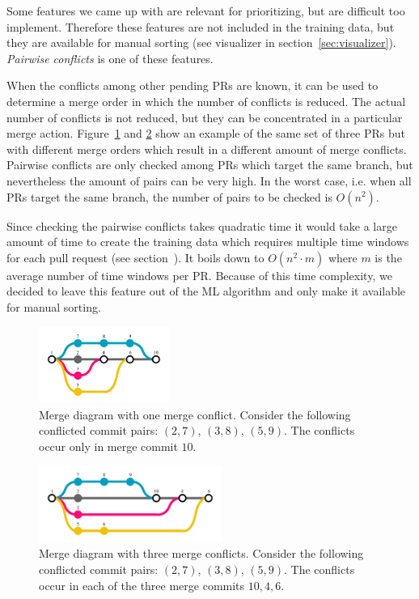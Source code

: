 Some features we came up with are relevant for prioritizing, but are difficult too implement.
Therefore these features are not included in the training data, but they are available for manual sorting (see visualizer in section~\ref{sec:visualizer}).
\emph{Pairwise conflicts} is one of these features.

When the conflicts among other pending PRs are known, it can be used to determine a merge order in which the number of conflicts is reduced.
The actual number of conflicts is not reduced, but they can be concentrated in a particular merge action.
Figure~\ref{fig:conflicts-1} and \ref{fig:conflicts-3} show an example of the same set of three PRs but with different merge orders which result in a different amount of merge conflicts.
Pairwise conflicts are only checked among PRs which target the same branch, but nevertheless the amount of pairs can be very high.
In the worst case, i.e. when all PRs target the same branch, the number of pairs to be checked is $O(n^2)$.

Since checking the pairwise conflicts takes quadratic time it would take a large amount of time to create the training data which requires multiple time windows for each pull request (see section~\label{sec:training}).
It boils down to $O(n^2 \cdot m)$ where $m$ is the average number of time windows per PR.
Because of this time complexity, we decided to leave this feature out of the ML algorithm and only make it available for manual sorting.

\begin{figure}
  \centering
  \includegraphics[height=25mm, clip ,trim = 0mm 7mm 0mm 7mm]{../figs/conflicts-1.pdf}
  \caption[Merge diagram with one conflict]
   {Merge diagram with one merge conflict.
   Consider the following conflicted commit pairs: $(2,7)$, $(3,8)$, $(5,9)$.
   The conflicts occur only in merge commit $10$.}
  \label{fig:conflicts-1}
\end{figure}

\begin{figure}
  \centering
  \includegraphics[height=25mm, clip ,trim = 0mm 7mm 0mm 7mm]{../figs/conflicts-3.pdf}
  \caption[Merge diagram with three merge conflicts]
   {Merge diagram with three merge conflicts.
   Consider the following conflicted commit pairs: $(2,7)$, $(3,8)$, $(5,9)$.
   The conflicts occur in each of the three merge commits $10,4,6$.}
  \label{fig:conflicts-3}
\end{figure}

